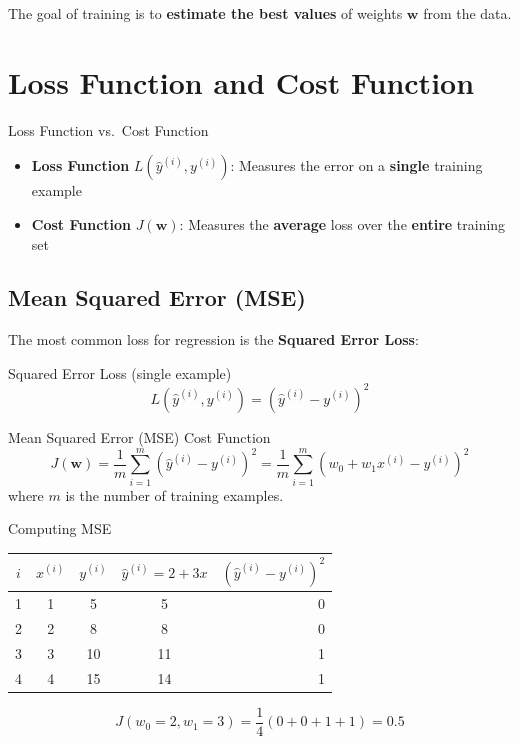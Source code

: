 \documentclass[12pt,a4paper]{report}
\begin{document}
The goal of training is to \textbf{estimate the best values} of weights $\mathbf{w}$ from the data.

\section{Loss Function and Cost Function}

\begin{defbox}{Loss Function vs.\ Cost Function}
\begin{itemize}[noitemsep]
  \item \textbf{Loss Function} $L(\hat{y}^{(i)}, y^{(i)})$: Measures the error on a \textbf{single} training example
  \item \textbf{Cost Function} $J(\mathbf{w})$: Measures the \textbf{average} loss over the \textbf{entire} training set
\end{itemize}
\end{defbox}

\subsection{Mean Squared Error (MSE)}

The most common loss for regression is the \textbf{Squared Error Loss}:

\begin{formulabox}{Squared Error Loss (single example)}
\[
L(\hat{y}^{(i)}, y^{(i)}) = \left( \hat{y}^{(i)} - y^{(i)} \right)^2
\]
\end{formulabox}

\begin{formulabox}{Mean Squared Error (MSE) Cost Function}
\[
J(\mathbf{w}) = \frac{1}{m} \sum_{i=1}^{m} \left( \hat{y}^{(i)} - y^{(i)} \right)^2 = \frac{1}{m} \sum_{i=1}^{m} \left( w_0 + w_1 x^{(i)} - y^{(i)} \right)^2
\]
where $m$ is the number of training examples.
\end{formulabox}

\begin{examplebox}{Computing MSE}
\begin{center}
\begin{tabular}{ccccr}
\toprule
$i$ & $x^{(i)}$ & $y^{(i)}$ & $\hat{y}^{(i)} = 2 + 3x$ & $(\hat{y}^{(i)} - y^{(i)})^2$ \\
\midrule
1 & 1 & 5 & 5 & 0 \\
2 & 2 & 8 & 8 & 0 \\
3 & 3 & 10 & 11 & 1 \\
4 & 4 & 15 & 14 & 1 \\
\bottomrule
\end{tabular}
\end{center}

\[
J(w_0=2, w_1=3) = \frac{1}{4}(0 + 0 + 1 + 1) = 0.5
\]
\end{examplebox}
\end{document}
